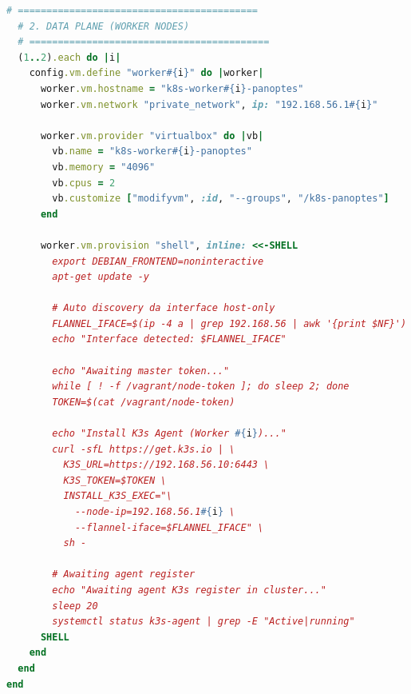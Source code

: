 \begin{lstlisting}[language=Ruby, caption={Vagrantfile configuration for Scenario 2 (PANOPTES Architecture)}, label={lst:vagrant-scenario2}]
  # ==========================================
  # 2. DATA PLANE (WORKER NODES)
  # ==========================================
  (1..2).each do |i|
    config.vm.define "worker#{i}" do |worker|
      worker.vm.hostname = "k8s-worker#{i}-panoptes"
      worker.vm.network "private_network", ip: "192.168.56.1#{i}"

      worker.vm.provider "virtualbox" do |vb|
        vb.name = "k8s-worker#{i}-panoptes"
        vb.memory = "4096"
        vb.cpus = 2
        vb.customize ["modifyvm", :id, "--groups", "/k8s-panoptes"]
      end

      worker.vm.provision "shell", inline: <<-SHELL
        export DEBIAN_FRONTEND=noninteractive
        apt-get update -y

        # Auto discovery da interface host-only
        FLANNEL_IFACE=$(ip -4 a | grep 192.168.56 | awk '{print $NF}')
        echo "Interface detected: $FLANNEL_IFACE"

        echo "Awaiting master token..."
        while [ ! -f /vagrant/node-token ]; do sleep 2; done
        TOKEN=$(cat /vagrant/node-token)

        echo "Install K3s Agent (Worker #{i})..."
        curl -sfL https://get.k3s.io | \
          K3S_URL=https://192.168.56.10:6443 \
          K3S_TOKEN=$TOKEN \
          INSTALL_K3S_EXEC="\
            --node-ip=192.168.56.1#{i} \
            --flannel-iface=$FLANNEL_IFACE" \
          sh -

        # Awaiting agent register
        echo "Awaiting agent K3s register in cluster..."
        sleep 20
        systemctl status k3s-agent | grep -E "Active|running"
      SHELL
    end
  end
end
\end{lstlisting}
